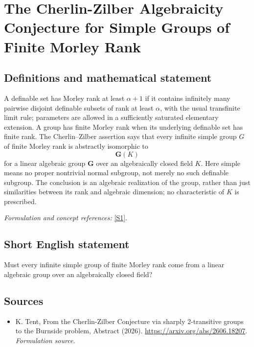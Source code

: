 \documentclass[11pt]{article}
\begin{document}
\section*{\texorpdfstring{The Cherlin-Zilber Algebraicity Conjecture for Simple Groups of Finite Morley Rank}{The Cherlin-Zilber Algebraicity Conjecture for Simple Groups of Finite Morley Rank}}\label{382}
\subsection{Definitions and mathematical statement}
A definable set has Morley rank at least $\alpha+1$ if it contains infinitely many pairwise disjoint definable subsets of rank at least $\alpha$, with the usual transfinite limit rule; parameters are allowed in a sufficiently saturated elementary extension. A group has finite Morley rank when its underlying definable set has finite rank. The Cherlin--Zilber assertion says that every infinite simple group $G$ of finite Morley rank is abstractly isomorphic to
\[
 \mathbf G(K)
\]
for a linear algebraic group $\mathbf G$ over an algebraically closed field $K$. Here simple means no proper nontrivial normal subgroup, not merely no such definable subgroup. The conclusion is an algebraic realization of the group, rather than just similarities between its rank and algebraic dimension; no characteristic of $K$ is prescribed.
\par\smallskip\textit{Formulation and concept references:} \href{https://arxiv.org/abs/2606.18207}{[S1]}.

\subsection{Short English statement}
Must every infinite simple group of finite Morley rank come from a linear algebraic group over an algebraically closed field?
\subsection{Sources}
\begin{itemize}
\item[S1]K. Tent, From the Cherlin-Zilber Conjecture via sharply 2-transitive groups to the Burnside problem, Abstract (2026).
\url{https://arxiv.org/abs/2606.18207}.
\textit{Formulation source.}
\end{itemize}
\end{document}
